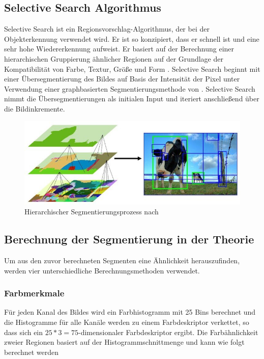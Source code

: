 \subsection{Selective Search Algorithmus}

Selective Search ist ein Regionsvorschlag-Algorithmus, der bei der Objekterkennung verwendet wird. Er ist so konzipiert, dass er schnell ist und eine sehr hohe Wiedererkennung aufweist. Er basiert auf der Berechnung einer hierarchischen Gruppierung ähnlicher Regionen auf der Grundlage der Kompatibilität von Farbe, Textur, Größe und Form \cites{learnopencv}{UijlingsIJCV2013}. Selective Search beginnt mit einer Übersegmentierung des Bildes auf Basis der Intensität der Pixel unter Verwendung einer graphbasierten Segmentierungsmethode von \citeauthor{felzenszwalb1998ciently} \cite{felzenszwalb1998ciently}. Selective Search nimmt die Übersegmentierungen als initialen Input und iteriert anschließend über die Bildinkremente. 

\begin{figure}
	\centering
	\includegraphics[width=\textwidth]{images/segmentation}
	\caption[Hierarchischer Segmentierungsprozess]{Hierarchischer Segmentierungsprozess nach \citeauthor{UijlingsIJCV2013}\cites{learnopencv}{UijlingsIJCV2013}}
	\label{fig:segmentation}
\end{figure}

\subsection{Berechnung der Segmentierung in der Theorie}

Um aus den zuvor berechneten Segmenten eine Ähnlichkeit herauszufinden, werden vier unterschiedliche Berechnungsmethoden verwendet. 

\subsubsection*{Farbmerkmale}

Für jeden Kanal des Bildes wird ein Farbhistogramm mit 25 \glspl{Bin} berechnet und die Histogramme für alle Kanäle werden zu einem Farbdeskriptor verkettet, so dass sich ein $25*3 = 75$-dimensionaler Farbdeskriptor ergibt. Die Farbähnlichkeit zweier Regionen basiert auf der Histogrammschnittmenge und kann wie folgt berechnet werden \cite{learnopencv}

